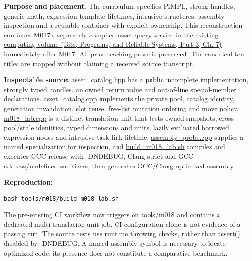 \textbf{Purpose and placement.} The curriculum specifies PIMPL, strong handles, generic math, expression-template lifetimes, intrusive structures, assembly inspection and a reusable container with explicit ownership. This reconstruction continues M017's separately compiled asset-query service in \href{../01-Bits-Programs-and-Reliable-Systems-P03/main.pdf\#nameddest=01-foundations-i-ch007-a-registry-crosses-its-last-c-boundary-hidden-implementation-typed-identity-and-measured-abstraction-cost}{the existing computing volume (Bits, Programs, and Reliable Systems, Part 3, Ch. 7)} immediately after M017. All prior teaching prose is preserved. \hyperref[appendix-fd090d982a15-m018-parts-291300-the-same-asset-service-becomes-a-typed-hidden-and-measurable-engine-api]{The canonical ten titles} are mapped without claiming a received source transcript.

\textbf{Inspectable source:} \hyperref[source-file-0529c78555b675a2ae111228]{asset\_catalog.hpp} has a public incomplete implementation, strongly typed handles, an owned return value and out-of-line special-member declarations. \hyperref[source-file-04abded74b7e03edc5dcf870]{asset\_catalog.cpp} implements the private pool, catalog identity, generation invalidation, slot reuse, free-list mutation ordering and move policy. \hyperref[source-file-8aedc3fdcd10c91971507448]{m018\_lab.cpp} is a distinct translation unit that tests owned snapshots, cross-pool/stale identities, typed dimensions and units, lazily evaluated borrowed expression nodes and intrusive task-link lifetime. \hyperref[source-file-eab7d4e282f0926fda89ab31]{assembly\_probe.cpp} supplies a named specialization for inspection, and \hyperref[source-file-c936569afa19be638ec87991]{build\_m018\_lab.sh} compiles and executes GCC release with -DNDEBUG, Clang strict and GCC address/undefined sanitizers, then generates GCC/Clang optimized assembly.

\textbf{Reproduction:}

\begin{verbatim}
bash tools/m018/build_m018_lab.sh
\end{verbatim}

The pre-existing \hyperref[source-file-3b1d957d4b185d11d5c207e1]{CI workflow} now triggers on tools/m018 and contains a dedicated multi-translation-unit job. CI configuration alone is not evidence of a passing run. The source tests use runtime throwing checks, rather than assert() disabled by -DNDEBUG. A named assembly symbol is necessary to locate optimized code; its presence does not constitute a comparative benchmark.

